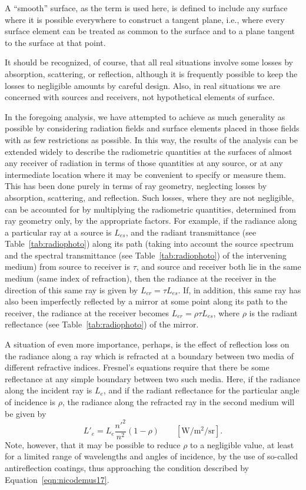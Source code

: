 A “smooth” surface, as the term is used here, is defined to include any
surface where it is possible everywhere to construct a tangent plane,
i.e., where every surface element can be treated as common to the
surface and to a plane tangent to the surface at that point.

It should be recognized, of course, that all real situations involve
some losses by absorption, scattering, or reflection, although it is
frequently possible to keep the losses to negligible amounts
by careful design. Also, in real situations we are concerned with sources
and receivers, not hypothetical elements of surface.

In the foregoing analysis, we have attempted to achieve as much generality
as possible by considering radiation fields and surface elements placed in
those fields with as few restrictions as possible. In this way, the results
of the analysis can be extended widely to describe the radiometric quantities
at the surfaces of almost any receiver of radiation in terms of those quantities
at any source, or at any intermediate location where it may be convenient to specify or measure
them. This has been done purely in terms of ray geometry, neglecting losses
by absorption, scattering, and reflection. Such losses, where they are
not negligible, can be accounted for by multiplying the radiometric quantities,
determined from ray geometry only, by the appropriate factors.
For example, if the radiance along a particular ray at a source is
$L_{es}$, and the radiant transmittance (see Table~\ref{tab:radiophoto}) along
its path (taking into account the source spectrum and the spectral transmittance
(see Table~\ref{tab:radiophoto}) of the intervening medium) from source to
receiver is $\tau$, and source and receiver both lie in the same medium (same
index of refraction), then the radiance at the receiver in the direction of
this same ray is given by $L_{er} = \tau L_{es}$. If, in addition, this same
ray has also been imperfectly reflected by a mirror at some point along its
path to the receiver, the radiance at the receiver becomes $L_{er} = \rho \tau L_{es}$,
where $\rho$ is the radiant reflectance (see Table~\ref{tab:radiophoto}) of
the mirror.

A situation of even more importance, perhaps, is the effect of reflection loss
on the radiance along a ray which is refracted at a boundary between two media
of different refractive indices.
Fresnel’s equations require that there be some reflectance at any simple
boundary between two such media. Here, if the radiance along the incident ray
is $L_e$, and if the radiant reflectance for the particular angle of incidence
is $\rho$, the radiance along the refracted ray in the second medium
will be given by
\begin{equation}
L'_e = L_e \frac{n'^2}{n^2} (1-\rho)
\qquad \left[\si{\watt\per\square\meter\per\steradian}\right].
\end{equation}
Note, however, that it may be possible to reduce $\rho$ to a negligible value,
at least for a limited range of wavelengths and angles of incidence, by the
use of so-called antireflection coatings, thus approaching the condition
described by Equation~\ref{eqn:nicodemus17}.

